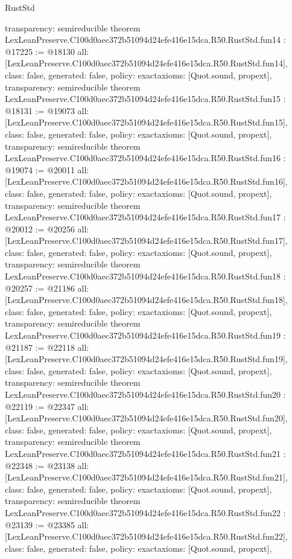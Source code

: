 \begin{lexlean}{RustStd}
\begin{coremodule}
{  transparency: semireducible
}
theorem LexLeanPreserve.C100d0aec372b51094d24efe416e15dca.R50.RustStd.fun14 : @17225 := @18130 {
  all: [LexLeanPreserve.C100d0aec372b51094d24efe416e15dca.R50.RustStd.fun14],
  class: false,
  generated: false,
  policy: exact{axioms: [Quot.sound, propext]},
  transparency: semireducible
}
theorem LexLeanPreserve.C100d0aec372b51094d24efe416e15dca.R50.RustStd.fun15 : @18131 := @19073 {
  all: [LexLeanPreserve.C100d0aec372b51094d24efe416e15dca.R50.RustStd.fun15],
  class: false,
  generated: false,
  policy: exact{axioms: [Quot.sound, propext]},
  transparency: semireducible
}
theorem LexLeanPreserve.C100d0aec372b51094d24efe416e15dca.R50.RustStd.fun16 : @19074 := @20011 {
  all: [LexLeanPreserve.C100d0aec372b51094d24efe416e15dca.R50.RustStd.fun16],
  class: false,
  generated: false,
  policy: exact{axioms: [Quot.sound, propext]},
  transparency: semireducible
}
theorem LexLeanPreserve.C100d0aec372b51094d24efe416e15dca.R50.RustStd.fun17 : @20012 := @20256 {
  all: [LexLeanPreserve.C100d0aec372b51094d24efe416e15dca.R50.RustStd.fun17],
  class: false,
  generated: false,
  policy: exact{axioms: [Quot.sound, propext]},
  transparency: semireducible
}
theorem LexLeanPreserve.C100d0aec372b51094d24efe416e15dca.R50.RustStd.fun18 : @20257 := @21186 {
  all: [LexLeanPreserve.C100d0aec372b51094d24efe416e15dca.R50.RustStd.fun18],
  class: false,
  generated: false,
  policy: exact{axioms: [Quot.sound, propext]},
  transparency: semireducible
}
theorem LexLeanPreserve.C100d0aec372b51094d24efe416e15dca.R50.RustStd.fun19 : @21187 := @22118 {
  all: [LexLeanPreserve.C100d0aec372b51094d24efe416e15dca.R50.RustStd.fun19],
  class: false,
  generated: false,
  policy: exact{axioms: [Quot.sound, propext]},
  transparency: semireducible
}
theorem LexLeanPreserve.C100d0aec372b51094d24efe416e15dca.R50.RustStd.fun20 : @22119 := @22347 {
  all: [LexLeanPreserve.C100d0aec372b51094d24efe416e15dca.R50.RustStd.fun20],
  class: false,
  generated: false,
  policy: exact{axioms: [Quot.sound, propext]},
  transparency: semireducible
}
theorem LexLeanPreserve.C100d0aec372b51094d24efe416e15dca.R50.RustStd.fun21 : @22348 := @23138 {
  all: [LexLeanPreserve.C100d0aec372b51094d24efe416e15dca.R50.RustStd.fun21],
  class: false,
  generated: false,
  policy: exact{axioms: [Quot.sound, propext]},
  transparency: semireducible
}
theorem LexLeanPreserve.C100d0aec372b51094d24efe416e15dca.R50.RustStd.fun22 : @23139 := @23385 {
  all: [LexLeanPreserve.C100d0aec372b51094d24efe416e15dca.R50.RustStd.fun22],
  class: false,
  generated: false,
  policy: exact{axioms: [Quot.sound, propext]},
}
\end{coremodule}
\end{lexlean}
